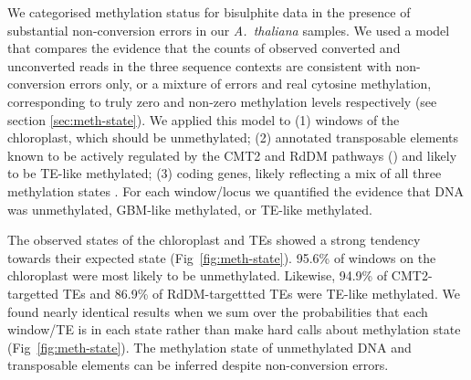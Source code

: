 \documentclass[10pt,letterpaper]{article}
\begin{document}
We categorised methylation status for bisulphite data in the presence of substantial non-conversion errors in our \emph{A.~thaliana} samples.
We used a model that compares the evidence that the counts of observed converted and unconverted reads in the three sequence contexts are consistent with non-conversion errors only, or a mixture of errors and real cytosine methylation, corresponding to truly zero and non-zero methylation levels respectively (see section \ref{sec:meth-state}).
We applied this model to (1) windows of the chloroplast, which should be unmethylated; (2) annotated transposable elements known to be actively regulated by the CMT2 and RdDM pathways (\cite{stroud2013comprehensive}) and likely to be TE-like methylated; (3) coding genes, likely reflecting a mix of all three methylation states \cite{zhang2020natural}.
For each window/locus we quantified the evidence that DNA was unmethylated, GBM-like methylated, or TE-like methylated.

The observed states of the chloroplast and TEs showed a strong tendency towards their expected state (Fig~\ref{fig:meth-state}).
95.6\% of windows on the chloroplast were most likely to be unmethylated.
Likewise, 94.9\% of CMT2-targetted TEs and 86.9\% of RdDM-targettted TEs were TE-like methylated.
We found nearly identical results when we sum over the probabilities that each window/TE is in each state rather than make hard calls about methylation state (Fig~\ref{fig:meth-state}).
The methylation state of unmethylated DNA and transposable elements can be inferred despite non-conversion errors.
\end{document}
